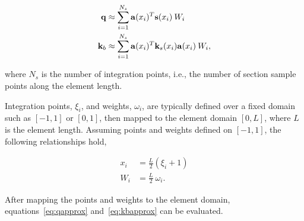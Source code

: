 \documentclass[12pt]{article}
\begin{document}
\begin{align}
\label{eq:qapprox} {\bf q} &\approx
\sum_{i=1}^{N_s} {\bf a}(x_i)^T {\bf s}(x_i) \: W_i \\
\label{eq:kbapprox}{\bf k}_b &\approx
\sum_{i=1}^{N_s} {\bf a}(x_i)^T {\bf k}_s(x_i) {\bf a}(x_i) \: W_i ,
\end{align}

\noindent where $N_s$ is the number of integration points, i.e., the number of section
sample points along the element length.

Integration points, $\xi_i$, and weights, $\omega_i$, are typically
defined over a fixed domain such as $\left[-1,1\right]$ or $\left[0,1\right]$, then
mapped to the element domain $\left[0,L\right]$, where $L$ is the element length.
Assuming points and weights defined on $\left[-1,1\right]$, the following
relationships hold,

\begin{align}
x_i &= \frac{L}{2} \left( \xi_i+1 \right) \\
W_i &= \frac{L}{2} \: \omega_i .
\end{align}

\noindent After mapping the points and weights to the element domain,
equations~\ref{eq:qapprox} and~\ref{eq:kbapprox} can be evaluated.
\end{document}
